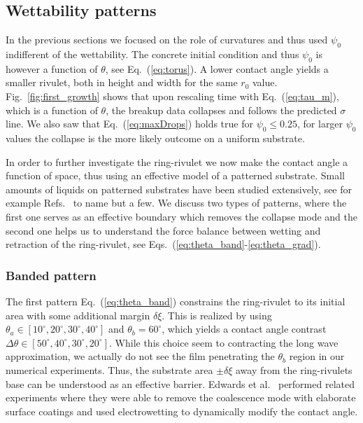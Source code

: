 \documentclass[twoside,twocolumn,9pt]{article}
\begin{document}
\subsection{Wettability patterns}\label{subsec:wettability}
In the previous sections we focused on the role of curvatures and thus used $\psi_0$ indifferent of the wettability. 
The concrete initial condition and thus $\psi_0$ is however a function of $\theta$, see Eq.~(\ref{eq:torus}).
A lower contact angle yields a smaller rivulet, both in height and width for the same $r_0$ value.
Fig.~\ref{fig:first_growth} shows that upon rescaling time with Eq.~(\ref{eq:tau_m}), which is a function of $\theta$, the breakup data collapses and follows the predicted $\sigma$ line.
We also saw that Eq.~(\ref{eq:maxDrops}) holds true for $\psi_0 \leq 0.25$, for larger $\psi_0$ values the collapse is the more likely outcome on a uniform substrate.

In order to further investigate the ring-rivulet we now make the contact angle a function of space, thus using an effective model of a patterned substrate. 
Small amounts of liquids on patterned substrates have been studied extensively, see for example Refs.~\cite{savvaDropletMotionInclined2013, vellingiriDropletSpreadingChemically2011, wangWettingEffectPatterned2023, wuInvestigationEquilibriumDroplet2019} to name but a few.
We discuss two types of patterns, where the first one serves as an effective boundary which removes the collapse mode and the second one helps us to understand the force balance between wetting and retraction of the ring-rivulet, see Eqs.~(\ref{eq:theta_band}-\ref{eq:theta_grad}).

\subsubsection{Banded pattern}\label{subsubsec:banded}
The first pattern Eq.~(\ref{eq:theta_band}) constrains the ring-rivulet to its initial area with some additional margin $\delta\xi$.
This is realized by using $\theta_a \in [10^{\circ}, 20^{\circ}, 30^{\circ}, 40^{\circ}]$ and $\theta_b = 60^{\circ}$, which yields a contact angle contrast $\Delta\theta \in [50^{\circ}, 40^{\circ}, 30^{\circ}, 20^{\circ}]$.
While this choice seem to contracting the long wave approximation, we actually do not see the film penetrating the $\theta_b$ region in our numerical experiments.
Thus, the substrate area $\pm\delta\xi$ away from the ring-rivulets base can be understood as an effective barrier. 
Edwards et al.~\cite{edwardsControllingBreakupToroidal2021} performed related experiments where they were able to remove the coalescence mode with elaborate surface coatings and used electrowetting to dynamically modify the contact angle.
\end{document}
